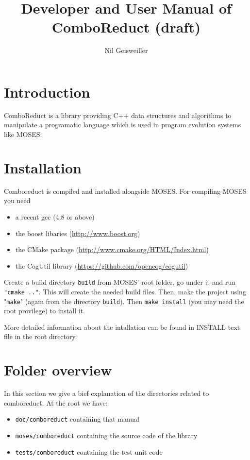 \documentclass{article}
\title{Developer and User Manual of ComboReduct (draft)}
\author{Nil Geisweiller}
\begin{document}
  
  \maketitle
  
  \tableofcontents
  
  \newpage
  
  \section{Introduction}
  
  ComboReduct is a library providing C++ data structures and algorithms 
  to manipulate a programatic language which is used in program evolution 
  systems like MOSES.
  
  \section{Installation}
  
  Comboreduct is compiled and installed alongside MOSES. For compiling
  MOSES you need
  \begin{itemize}
  \item a recent gcc (4.8 or above)
  \item the boost libaries (\url{http://www.boost.org})
  \item the CMake package (\url{http://www.cmake.org/HTML/Index.html})
  \item the CogUtil library (\url{https://github.com/opencog/cogutil})
  \end{itemize}
  
  Create a build directory \verb|build| from MOSES' root folder, go
  under it and run \verb|"cmake .."|. This will create the needed
  build files. Then, make the project using "\verb|make|" (again from
  the directory \verb|build|). Then \verb|make install| (you may need
  the root provilege) to install it.
  
  More detailed information about the intallation can be found in INSTALL text
  file in the root directory.

  \section{Folder overview}

  In this section we give a bief explanation of the directories
  related to comboreduct. At the root we have:
  \begin{itemize}
  \item \verb|doc/comboreduct| containing that manual
  \item \verb|moses/comboreduct| containing the source code of the library
  \item \verb|tests/comboreduct| containing the test unit code
  \end{itemize}
  
\end{document}
